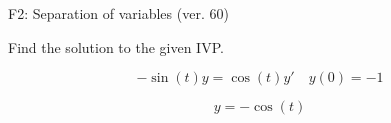 \begin{exercise}
  \begin{exerciseTitle}F2: Separation of variables (ver. 60)\end{exerciseTitle}
  \begin{exerciseStatement}
    
Find the solution to the given IVP.

    
\[-\sin\left(t\right) y= \cos\left(t\right) y'\hspace{1em} y\left( 0 \right)= -1\]

  \end{exerciseStatement}
  \begin{exerciseAnswer}
    
\[y= -\cos\left(t\right)\]

  \end{exerciseAnswer}
\end{exercise}